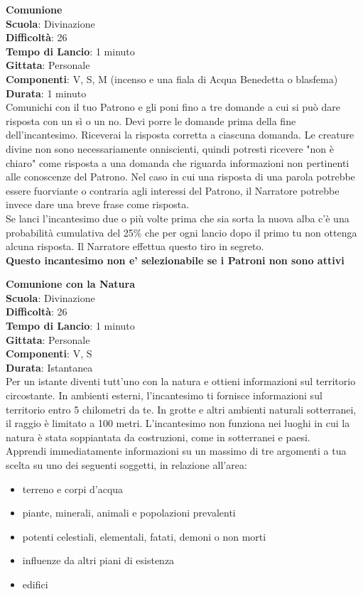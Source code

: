 \begin{multicols}{2}
\medskip\textbf{Comunione}\\
\textbf{Scuola}: Divinazione\\
\textbf{Difficoltà}: 26\\
\textbf{Tempo di Lancio}: 1 minuto\\
\textbf{Gittata}: Personale\\
\textbf{Componenti}: V, S, M (incenso e una fiala di Acqua Benedetta o blasfema)\\
\textbf{Durata}: 1 minuto\\
Comunichi con il tuo Patrono e gli poni fino a tre domande a cui si può dare risposta con un sì o un no. Devi porre le domande prima della fine dell'incantesimo. Riceverai la risposta corretta a ciascuna domanda. Le creature divine non sono necessariamente onniscienti, quindi potresti ricevere "non è chiaro" come risposta a una domanda che riguarda informazioni non pertinenti alle conoscenze del Patrono. Nel caso in cui una risposta di una parola potrebbe essere fuorviante o contraria agli interessi del Patrono, il Narratore potrebbe invece dare una breve frase come risposta.\\
Se lanci l'incantesimo due o più volte prima che sia sorta la nuova alba c'è una probabilità cumulativa del 25\% che per ogni lancio dopo il primo tu non ottenga alcuna risposta. Il Narratore effettua questo tiro in segreto.\\
\textbf{Questo incantesimo non e' selezionabile se i Patroni non sono attivi}

\medskip\textbf{Comunione con la Natura}\\
\textbf{Scuola}: Divinazione\\
\textbf{Difficoltà}: 26\\
\textbf{Tempo di Lancio}: 1 minuto\\
\textbf{Gittata}: Personale\\
\textbf{Componenti}: V, S\\
\textbf{Durata}: Istantanea\\
Per un istante diventi tutt'uno con la natura e ottieni informazioni sul territorio circostante. In ambienti esterni, l'incantesimo ti fornisce informazioni sul territorio entro 5 chilometri da te. In grotte e altri ambienti naturali sotterranei, il raggio è limitato a 100 metri. L'incantesimo non funziona nei luoghi in cui la natura è stata soppiantata da costruzioni, come in sotterranei e paesi.\\
Apprendi immediatamente informazioni su un massimo di tre argomenti a tua scelta su uno dei seguenti soggetti, in relazione all'area:
\begin{itemize}
	\item 
	terreno e corpi d'acqua
	\item 
	piante, minerali, animali e popolazioni prevalenti
	\item 
  potenti celestiali, elementali, fatati, demoni o non morti
	\item 
  influenze da altri piani di esistenza
	\item
  edifici
\end{itemize}


\end{multicols}
